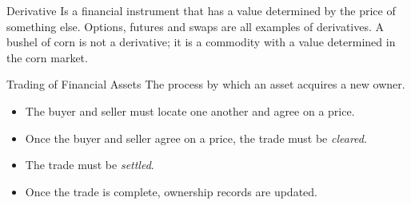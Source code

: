 \begin{frame}
\begin{block}{Derivative}
Is a financial instrument that has a value determined by the price of something else. Options, futures and swaps are all examples of derivatives. A bushel of corn is not a derivative; it is a commodity with a value determined in the corn market.
\end{block}

\begin{block}{Trading of Financial Assets}
The process by which an asset acquires a new owner.
\begin{itemize}
	\item The buyer and seller must locate one another and agree on a price.
	\item Once the buyer and seller agree on a price, the trade must be \emph{cleared}.
	\item The trade must be \emph{settled}.
	\item Once the trade is complete, ownership records are updated.
\end{itemize}
\end{block}

\end{frame}